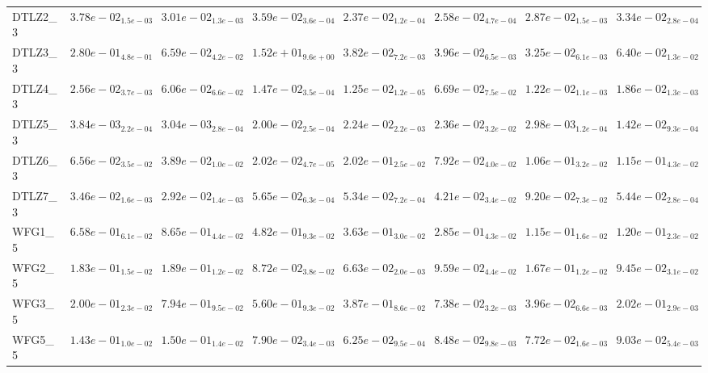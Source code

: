 \documentclass{article}
\begin{document}
\begin{landscape}
\begin{table}
\begin{scriptsize}
\begin{tabular}{llllllll}
DTLZ2\_3 & $  3.78e-02_{ 1.5e-03}$ & $  3.01e-02_{ 1.3e-03}$ & $  3.59e-02_{ 3.6e-04}$ & \cellcolor{gray95}$  2.37e-02_{ 1.2e-04}$ & \cellcolor{gray25}$  2.58e-02_{ 4.7e-04}$ & $  2.87e-02_{ 1.5e-03}$ & $  3.34e-02_{ 2.8e-04}$ \\
DTLZ3\_3 & $  2.80e-01_{ 4.8e-01}$ & $  6.59e-02_{ 4.2e-02}$ & $  1.52e+01_{ 9.6e+00}$ & \cellcolor{gray25}$  3.82e-02_{ 7.2e-03}$ & $  3.96e-02_{ 6.5e-03}$ & \cellcolor{gray95}$  3.25e-02_{ 6.1e-03}$ & $  6.40e-02_{ 1.3e-02}$ \\
DTLZ4\_3 & $  2.56e-02_{ 3.7e-03}$ & $  6.06e-02_{ 6.6e-02}$ & $  1.47e-02_{ 3.5e-04}$ & \cellcolor{gray25}$  1.25e-02_{ 1.2e-05}$ & $  6.69e-02_{ 7.5e-02}$ & \cellcolor{gray95}$  1.22e-02_{ 1.1e-03}$ & $  1.86e-02_{ 1.3e-03}$ \\
DTLZ5\_3 & $  3.84e-03_{ 2.2e-04}$ & \cellcolor{gray25}$  3.04e-03_{ 2.8e-04}$ & $  2.00e-02_{ 2.5e-04}$ & $  2.24e-02_{ 2.2e-03}$ & $  2.36e-02_{ 3.2e-02}$ & \cellcolor{gray95}$  2.98e-03_{ 1.2e-04}$ & $  1.42e-02_{ 9.3e-04}$ \\
DTLZ6\_3 & $  6.56e-02_{ 3.5e-02}$ & \cellcolor{gray25}$  3.89e-02_{ 1.0e-02}$ & \cellcolor{gray95}$  2.02e-02_{ 4.7e-05}$ & $  2.02e-01_{ 2.5e-02}$ & $  7.92e-02_{ 4.0e-02}$ & $  1.06e-01_{ 3.2e-02}$ & $  1.15e-01_{ 4.3e-02}$ \\
DTLZ7\_3 & \cellcolor{gray25}$  3.46e-02_{ 1.6e-03}$ & \cellcolor{gray95}$  2.92e-02_{ 1.4e-03}$ & $  5.65e-02_{ 6.3e-04}$ & $  5.34e-02_{ 7.2e-04}$ & $  4.21e-02_{ 3.4e-02}$ & $  9.20e-02_{ 7.3e-02}$ & $  5.44e-02_{ 2.8e-04}$ \\
WFG1\_5 & $  6.58e-01_{ 6.1e-02}$ & $  8.65e-01_{ 4.4e-02}$ & $  4.82e-01_{ 9.3e-02}$ & $  3.63e-01_{ 3.0e-02}$ & $  2.85e-01_{ 4.3e-02}$ & \cellcolor{gray95}$  1.15e-01_{ 1.6e-02}$ & \cellcolor{gray25}$  1.20e-01_{ 2.3e-02}$ \\
WFG2\_5 & $  1.83e-01_{ 1.5e-02}$ & $  1.89e-01_{ 1.2e-02}$ & \cellcolor{gray25}$  8.72e-02_{ 3.8e-02}$ & \cellcolor{gray95}$  6.63e-02_{ 2.0e-03}$ & $  9.59e-02_{ 4.4e-02}$ & $  1.67e-01_{ 1.2e-02}$ & $  9.45e-02_{ 3.1e-02}$ \\
WFG3\_5 & $  2.00e-01_{ 2.3e-02}$ & $  7.94e-01_{ 9.5e-02}$ & $  5.60e-01_{ 9.3e-02}$ & $  3.87e-01_{ 8.6e-02}$ & \cellcolor{gray25}$  7.38e-02_{ 3.2e-03}$ & \cellcolor{gray95}$  3.96e-02_{ 6.6e-03}$ & $  2.02e-01_{ 2.9e-03}$ \\
WFG5\_5 & $  1.43e-01_{ 1.0e-02}$ & $  1.50e-01_{ 1.4e-02}$ & $  7.90e-02_{ 3.4e-03}$ & \cellcolor{gray95}$  6.25e-02_{ 9.5e-04}$ & $  8.48e-02_{ 9.8e-03}$ & \cellcolor{gray25}$  7.72e-02_{ 1.6e-03}$ & $  9.03e-02_{ 5.4e-03}$ \\

\end{tabular}
\end{scriptsize}
\end{table}
\end{landscape}
\end{document}
